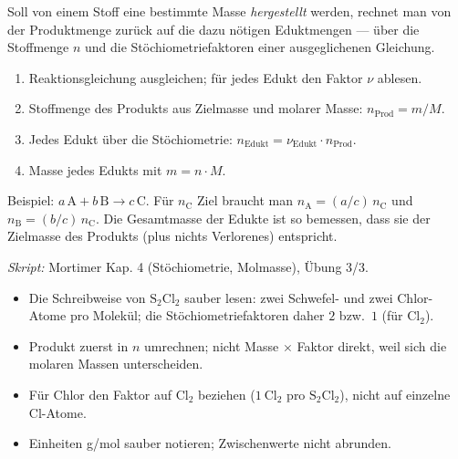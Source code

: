 

Soll von einem Stoff eine bestimmte Masse \emph{hergestellt} werden, rechnet
man von der Produktmenge zurück auf die dazu nötigen Eduktmengen --- über die
Stoffmenge $n$ und die Stöchiometriefaktoren einer ausgeglichenen Gleichung.

\begin{werkzeugkasten}
\begin{enumerate}
  \item Reaktionsgleichung ausgleichen; für jedes Edukt den Faktor $\nu$ ablesen.
  \item Stoffmenge des Produkts aus Zielmasse und molarer Masse:
        $n_{\mathrm{Prod}} = m/M$.
  \item Jedes Edukt über die Stöchiometrie: $n_{\mathrm{Edukt}} =
        \nu_{\mathrm{Edukt}}\cdot n_{\mathrm{Prod}}$.
  \item Masse jedes Edukts mit $m = n\cdot M$.
\end{enumerate}
Beispiel: $a\,\mathrm{A} + b\,\mathrm{B} \rightarrow c\,\mathrm{C}$.
Für $n_{\mathrm{C}}$ Ziel braucht man $n_{\mathrm{A}} = (a/c)\,n_{\mathrm{C}}$
und $n_{\mathrm{B}} = (b/c)\,n_{\mathrm{C}}$. Die Gesamtmasse der Edukte ist
so bemessen, dass sie der Zielmasse des Produkts (plus nichts Verlorenes)
entspricht.

\textit{Skript:} Mortimer Kap. 4 (Stöchiometrie, Molmasse), Übung 3/3.
\end{werkzeugkasten}

\begin{achtung}
\begin{itemize}
  \item Die Schreibweise von $\mathrm{S_2Cl_2}$ sauber lesen: zwei Schwefel-
        und zwei Chlor-Atome pro Molekül; die Stöchiometriefaktoren daher
        $2$ bzw.\ $1$ (für $\mathrm{Cl_2}$).
  \item Produkt zuerst in $n$ umrechnen; nicht Masse $\times$ Faktor direkt,
        weil sich die molaren Massen unterscheiden.
  \item Für Chlor den Faktor auf $\mathrm{Cl_2}$ beziehen ($1\ \mathrm{Cl_2}$
        pro $\mathrm{S_2Cl_2}$), nicht auf einzelne Cl-Atome.
  \item Einheiten g/mol sauber notieren; Zwischenwerte nicht abrunden.
\end{itemize}
\end{achtung}
